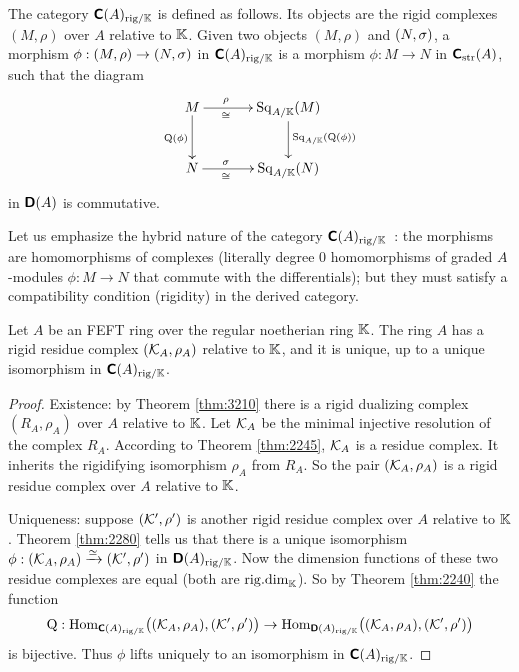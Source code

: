 \begin{dfn} \label{dfn:2536}
The category $\boldsymbol{\mathsf{C}}(A)_{\mathrm{rig} / \mathbb{K}}$
is defined as follows. Its objects are the rigid complexes $(M, \rho)$ over $A$ 
relative to $\mathbb{K}$. Given two objects 
$(M, \rho)$ and $(N, \sigma)$, a morphism 
$\phi : (M, \rho) \to (N, \sigma)$
in $\boldsymbol{\mathsf{C}}(A)_{\mathrm{rig} / \mathbb{K}}$ is a morphism 
$\phi : M \to  N$ in $\boldsymbol{\mathsf{C}}_{\mathrm{str}}(A)$,
such that the diagram 
\[ \UseTips \xymatrix @C=8ex @R=6ex {
M
\ar[d]_{\opn{Q}(\phi)}
\ar[r]^(0.35){\rho}_(0.35){\cong}
&
\opn{Sq}_{A / \K}(M)
\ar[d]^{\opn{Sq}_{A / \K}(\opn{Q}(\phi))}
\\
N
\ar[r]^(0.35){\si}_(0.35){\cong}
&
\opn{Sq}_{A / \K}(N)
} \]
in $\boldsymbol{\mathsf{D}}(A)$ is commutative.
\end{dfn}

Let us emphasize the hybrid nature of the category 
$\boldsymbol{\mathsf{C}}(A)_{\mathrm{rig} / \mathbb{K}}$~:
the morphisms are homomorphisms of complexes (literally degree $0$ 
homomorphisms of graded $A$-modules  $\phi : M \to N$ that commute with the 
differentials); but they must satisfy a compatibility condition (rigidity) in 
the derived category. 

\begin{thm} \label{thm:2535}
Let $A$ be an FEFT ring over the regular noetherian ring 
$\mathbb{K}$. The ring $A$ has a rigid residue complex $(\mathcal{K}_{A}, \rho_{A})$ 
relative to $\mathbb{K}$, and it is unique, up to a unique isomorphism in 
$\boldsymbol{\mathsf{C}}(A)_{\mathrm{rig} / \mathbb{K}}$.
\end{thm}

\begin{proof}
Existence: by Theorem \ref{thm:3210} there is a rigid dualizing complex 
$(R_{A}, \rho_{A})$ over $A$ relative to $\mathbb{K}$. Let 
$\mathcal{K}_{A}$ be the minimal injective resolution of the complex $R_{A}$. 
According to Theorem \ref{thm:2245}, $\mathcal{K}_{A}$ is a residue complex. It 
inherits the rigidifying isomorphism $\rho_{A}$ from $R_{A}$. So the 
pair $(\mathcal{K}_{A}, \rho_{A})$ is a rigid residue complex over $A$ relative to 
$\mathbb{K}$. 

Uniqueness: suppose $(\mathcal{K}', \rho')$ is another rigid residue complex over 
$A$ relative to $\mathbb{K}$.  Theorem \ref{thm:2280} tells us that there is a unique 
isomorphism 
$\phi : (\mathcal{K}_{A}, \rho_{A}) \xrightarrow{\simeq} (\mathcal{K}', \rho')$
in $\boldsymbol{\mathsf{D}}(A)_{\mathrm{rig} / \mathbb{K}}$. 
Now the dimension functions of these two residue complexes are equal (both are 
$\operatorname{rig{.}dim}_{\mathbb{K}}$). So by Theorem \ref{thm:2240} the function 
\[ \operatorname{Q} : \operatorname{Hom}_{\boldsymbol{\mathsf{C}}(A)_{\mathrm{rig} / \mathbb{K}}}
\bigl( (\mathcal{K}_{A}, \rho_{A}), (\mathcal{K}', \rho') \bigr) \to 
\operatorname{Hom}_{\boldsymbol{\mathsf{D}}(A)_{\mathrm{rig} / \mathbb{K}}}
\bigl( (\mathcal{K}_{A}, \rho_{A}), (\mathcal{K}', \rho') \bigr) \]
is bijective. Thus $\phi$ lifts uniquely to an isomorphism in 
$\boldsymbol{\mathsf{C}}(A)_{\mathrm{rig} / \mathbb{K}}$. 
\end{proof}

